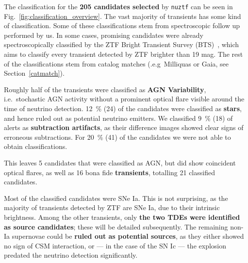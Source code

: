 The classification for the \textbf{205 candidates selected} by \texttt{nuztf} can be seen in Fig.~\ref{fig:classification_overview}. The vast majority of transients has some kind of classification. Some of these classifications stem from spectroscopic follow up performed by us. In some cases, promising candidates were already spectroscopically classified by the ZTF Bright Transient Survey (BTS)~, which aims to classify every transient detected by ZTF brighter than 19 mag. The rest of the classifications stem from catalog matches (.e.g\ Milliquas or Gaia, see Section~\ref{catmatch}).



Roughly half of the transients were classified as \textbf{AGN Variability}, i.e.\ stochastic AGN activity without a prominent optical flare visible around the time of neutrino detection. \SI{12}{\percent} (24) of the candidates were classified as \textbf{stars}, and hence ruled out as potential neutrino emitters. We classified \SI{9}{\percent} (18) of alerts as \textbf{subtraction artifacts}, as their difference images showed clear signs of erroneous subtractions. For \SI{20}{\percent} (41) of the candidates we were not able to obtain classifications.

This leaves 5 candidates that were classified as AGN, but did show coincident optical flares, as well as 16 bona fide \textbf{transients}, totalling 21 classified candidates.

Most of the classified candidates were SNe Ia. This is not surprising, as the majority of transients detected by ZTF are SNe Ia, due to their intrinsic brightness. Among the other transients, only \textbf{the two TDEs were identified as source candidates}; these will be detailed subsequently. The remaining non-Ia supernovae could be \textbf{ruled out as potential sources}, as they either showed no sign of CSM interaction, or --- in the case of the SN Ic --- the explosion predated the neutrino detection significantly.


